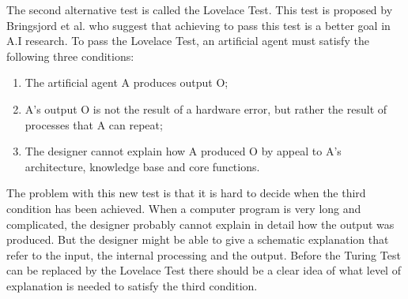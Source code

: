 The second alternative test is called the Lovelace Test. This test is proposed by Bringsjord et al. who suggest that achieving to pass this test is a better goal in A.I research. To pass the Lovelace Test, an artificial agent must satisfy the following three conditions:

\begin{enumerate}
   \item The artificial agent A produces output O;
   \item A's output O is not the result of a hardware error, but rather the result of processes that A can repeat;
   \item The designer cannot explain how A produced O by appeal to A's architecture, knowledge base and core functions.
\end{enumerate}

The problem with this new test is that it is hard to decide when the third condition has been achieved. When a computer program is very long and complicated, the designer probably cannot explain in detail how the output was produced. But the designer might be able to give a schematic explanation that refer to the input, the internal processing and the output. Before the Turing Test can be replaced by the Lovelace Test there should be a clear idea of what level of explanation is needed to satisfy the third condition.


